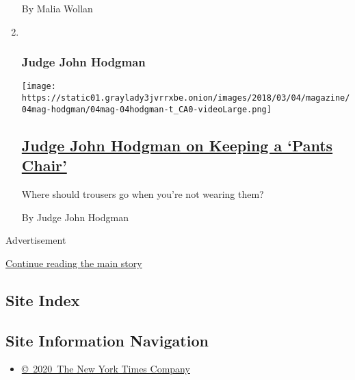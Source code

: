 \begin{enumerate}
  By Malia Wollan
\item ~
  \hypertarget{judge-john-hodgman}{%
  \subsubsection{Judge John Hodgman}\label{judge-john-hodgman}}

  \texttt{[image: https://static01.graylady3jvrrxbe.onion/images/2018/03/04/magazine/04mag-hodgman/04mag-04hodgman-t\_CA0-videoLarge.png]}

  \hypertarget{judge-john-hodgman-on-keeping-a-pants-chair}{%
  \subsection{\texorpdfstring{\href{/2018/03/01/magazine/judge-john-hodgman-on-keeping-a-pants-chair.html}{Judge
  John Hodgman on Keeping a `Pants
  Chair'}}{Judge John Hodgman on Keeping a `Pants Chair'}}\label{judge-john-hodgman-on-keeping-a-pants-chair}}

  Where should trousers go when you're not wearing them?

  By Judge John Hodgman
\end{enumerate}

Advertisement

\protect\hyperlink{after-mid1}{Continue reading the main story}

\hypertarget{site-index}{%
\subsection{Site Index}\label{site-index}}

\hypertarget{site-information-navigation}{%
\subsection{Site Information
Navigation}\label{site-information-navigation}}

\begin{itemize}
\tightlist
\item
  \href{https://help.nytimes3xbfgragh.onion/hc/en-us/articles/115014792127-Copyright-notice}{©~2020~The
  New York Times Company}
\end{itemize}


